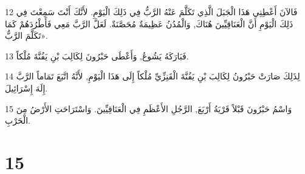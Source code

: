 \par 12 فَالآنَ أَعْطِنِي هَذَا الْجَبَلَ الَّذِي تَكَلَّمَ عَنْهُ الرَّبُّ فِي ذَلِكَ الْيَوْمِ. لأَنَّكَ أَنْتَ سَمِعْتَ فِي ذَلِكَ الْيَوْمِ أَنَّ الْعَنَاقِيِّينَ هُنَاكَ, وَالْمُدُنُ عَظِيمَةٌ مُحَصَّنَةٌ. لَعَلَّ الرَّبَّ مَعِي فَأَطْرُدَهُمْ كَمَا تَكَلَّمَ الرَّبُّ».
\par 13 فَبَارَكَهُ يَشُوعُ, وَأَعْطَى حَبْرُونَ لِكَالِبَ بْنِ يَفُنَّةَ مُلْكاً.
\par 14 لِذَلِكَ صَارَتْ حَبْرُونُ لِكَالِبَ بْنِ يَفُنَّةَ الْقَنِزِّيِّ مُلْكاً إِلَى هَذَا الْيَوْمِ, لأَنَّهُ اتَّبَعَ تَمَاماً الرَّبَّ إِلَهَ إِسْرَائِيلَ.
\par 15 وَاسْمُ حَبْرُونَ قَبْلاً قَرْيَةُ أَرْبَعَ, الرَّجُلِ الأَعْظَمِ فِي الْعَنَاقِيِّينَ. وَاسْتَرَاحَتِ الأَرْضُ مِنَ الْحَرْبِ.

\chapter{15}

